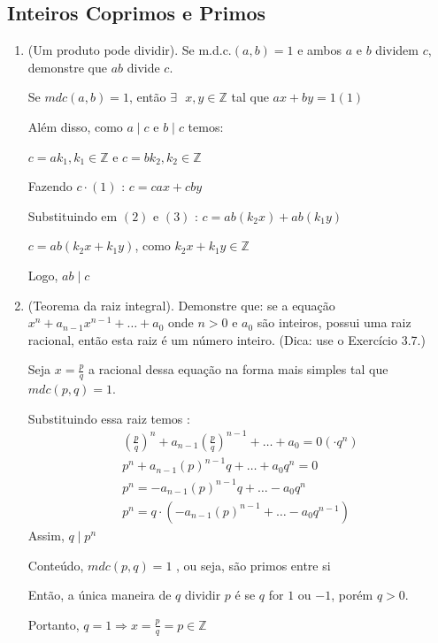 \subsection{Inteiros Coprimos e Primos}

\begin{enumerate}[label=4.\arabic*.]
    \item (Um produto pode dividir). Se m.d.c.$(a,b) = 1$ e ambos $a$ e $b$ dividem $c$, demonstre que $ab$ divide $c$.
    
    Se $mdc(a,b) = 1$, então $ \exists \text{ } x,y \in \mathbb{Z}$ tal que $ax + by = 1 (1)$

    Além disso, como $a \mid c$ e $b \mid c$ temos:
    
    $c = a k_1, k_1 \in \mathbb{Z}$ e $c = b k_2, k_2 \in \mathbb{Z}$ 
    
    Fazendo $c \cdot (1)$ : $c = cax + cby$

    Substituindo em $(2)$ e $(3)$ : 
    $c = ab(k_2x) + ab(k_1y)$

    $c = ab(k_2x + k_1y)$, como $k_2x + k_1y \in \mathbb{Z}$
    
    Logo, $ab \mid c$

    \item (Teorema da raiz integral). Demonstre que: se a equação $x^n + a_{n-1} x^{n-1} + \dots + a_0$ onde $n > 0$ e $a_0$ são inteiros, possui uma raiz racional, então esta raiz é um número inteiro. (Dica: use o Exercício 3.7.)
    
    Seja $x = \frac{p}{q}$ a racional dessa equação na forma mais simples tal que $mdc(p,q) = 1$.

    Substituindo essa raiz temos : 
    \begin{align*}
            (\frac{p}{q})^n + a_{n-1}(\frac{p}{q})^{n-1} + \ldots + a_0 = 0 (\cdot q^n) \\
            p^n + a_{n-1}(p)^{n-1}q + \ldots + a_0q^n = 0 \\ 
            p^n = - a_{n-1}(p)^{n-1}q + \ldots - a_0q^n \\
            p^n = q \cdot (- a_{n-1}(p)^{n-1} + \ldots - a_0q^{n-1})
    \end{align*}
    Assim, $q \mid p^n$

    Conteúdo, $mdc(p,q) = 1$ , ou seja, são primos entre si

    Então, a única maneira de $q$ dividir $p$ é se $q$ for $1$ ou $-1$, porém $q > 0$.

    Portanto, $q = 1 \Rightarrow x = \frac{p}{q} = p \in \mathbb{Z}$


\end{enumerate}
